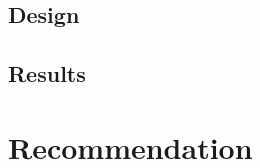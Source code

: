 \documentclass[a4]{article}
\begin{document}
\subsection{Design}
\subsection{Results}

\section{Recommendation}


\appendix

\end{document}
